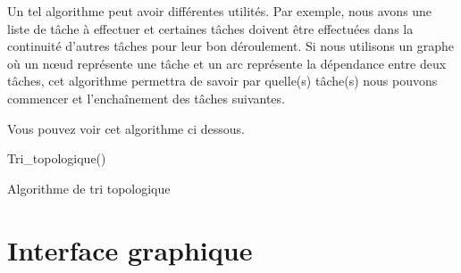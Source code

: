 \documentclass[11pt,a4paper]{article}
\begin{document}
				Un tel algorithme peut avoir différentes utilités. Par exemple, nous avons une liste de tâche à effectuer et certaines tâches doivent être effectuées dans la continuité d'autres tâches pour leur bon déroulement. Si nous utilisons un graphe où un n\oe ud représente une tâche et un arc représente la dépendance entre deux tâches, cet algorithme permettra de savoir par quelle(s) tâche(s) nous pouvons commencer et l'enchaînement des tâches suivantes.
				
				Vous pouvez voir cet algorithme ci dessous.
				\begin{algorithm}[htpb]
					Tri\_topologique()\\
					\caption{Algorithme de tri topologique}
				\end{algorithm}
			
			\vspace*{5cm}			
	\newpage
	\section{Interface graphique}
\end{document}
